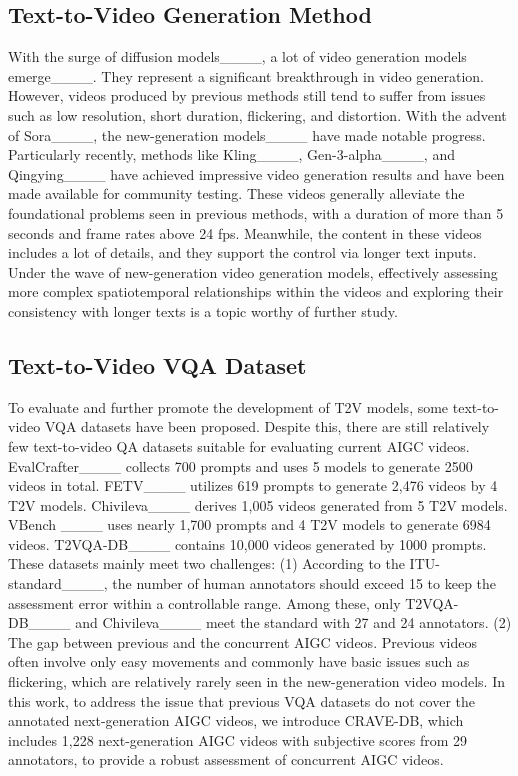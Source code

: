 \subsection{Text-to-Video Generation Method}
With the surge of diffusion models____, a lot of video generation models emerge____.
They represent a significant breakthrough in video generation. However, videos produced by previous methods still tend to suffer from issues such as low resolution, short duration, flickering, and distortion.
With the advent of Sora____, the new-generation models____ have made notable progress. Particularly recently, methods like Kling____, Gen-3-alpha____, and Qingying____ have achieved impressive video generation results and have been made available for community testing.
These videos generally alleviate the foundational problems seen in previous methods, with a duration of more than 5 seconds and frame rates above 24 fps.
Meanwhile, the content in these videos includes a lot of details, and they support the control via longer text inputs.
Under the wave of new-generation video generation models, effectively assessing more complex spatiotemporal relationships within the videos and exploring their consistency with longer texts is a topic worthy of further study.

\subsection{Text-to-Video VQA Dataset}
To evaluate and further promote the development of T2V models, some text-to-video VQA datasets have been proposed. 
Despite this, there are still relatively few text-to-video QA datasets suitable for evaluating current AIGC videos.
EvalCrafter____ collects 700 prompts and uses 5 models to generate 2500 videos in total.
FETV____ utilizes 619 prompts to generate 2,476 videos by 4 T2V models. 
Chivileva____ derives 1,005 videos generated from 5 T2V models.
VBench ____ uses nearly 1,700 prompts and 4 T2V models to generate 6984 videos. 
T2VQA-DB____ contains 10,000 videos generated by 1000 prompts. 
These datasets mainly meet two challenges:
(1) According to the  ITU-standard____, the number of human annotators should exceed 15 to keep the assessment error within a controllable range.
Among these, only T2VQA-DB____ and Chivileva____ meet the standard with 27 and 24 annotators. 
(2) The gap between previous and the concurrent AIGC videos. Previous videos often involve only easy movements and commonly have basic issues such as flickering, which are relatively rarely seen in the new-generation video models.
In this work, to address the issue that previous VQA datasets do not cover the annotated next-generation AIGC videos, we introduce CRAVE-DB, which includes 1,228 next-generation AIGC videos with subjective scores from 29 annotators, to provide a robust assessment of concurrent AIGC videos.